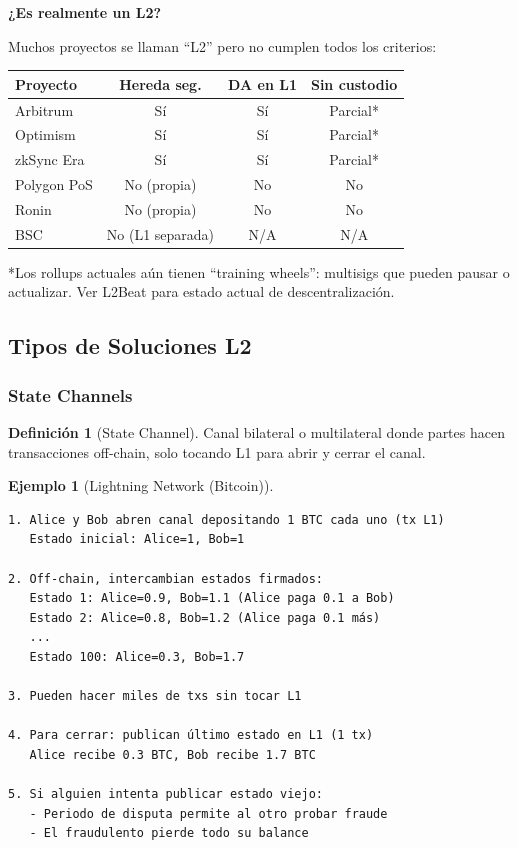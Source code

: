 \documentclass[11pt,a4paper,twoside,openright]{book}
\theoremstyle{definition}
\newtheorem{definition}{Definición}[chapter]
\newtheorem{example}{Ejemplo}[chapter]
\theoremstyle{plain}
\theoremstyle{remark}
\begin{document}
\begin{advertencia}
\textbf{¿Es realmente un L2?}

Muchos proyectos se llaman ``L2'' pero no cumplen todos los criterios:

\begin{center}
\begin{tabular}{lccc}
\toprule
\textbf{Proyecto} & \textbf{Hereda seg.} & \textbf{DA en L1} & \textbf{Sin custodio} \\
\midrule
Arbitrum & Sí & Sí & Parcial* \\
Optimism & Sí & Sí & Parcial* \\
zkSync Era & Sí & Sí & Parcial* \\
Polygon PoS & No (propia) & No & No \\
Ronin & No (propia) & No & No \\
BSC & No (L1 separada) & N/A & N/A \\
\bottomrule
\end{tabular}
\end{center}

*Los rollups actuales aún tienen ``training wheels'': multisigs que pueden pausar o actualizar. Ver L2Beat para estado actual de descentralización.
\end{advertencia}

\subsection{Tipos de Soluciones L2}

\subsubsection{State Channels}

\begin{definition}[State Channel]
Canal bilateral o multilateral donde partes hacen transacciones off-chain, solo tocando L1 para abrir y cerrar el canal.
\end{definition}

\begin{example}[Lightning Network (Bitcoin)]
\begin{verbatim}
1. Alice y Bob abren canal depositando 1 BTC cada uno (tx L1)
   Estado inicial: Alice=1, Bob=1

2. Off-chain, intercambian estados firmados:
   Estado 1: Alice=0.9, Bob=1.1 (Alice paga 0.1 a Bob)
   Estado 2: Alice=0.8, Bob=1.2 (Alice paga 0.1 más)
   ...
   Estado 100: Alice=0.3, Bob=1.7

3. Pueden hacer miles de txs sin tocar L1

4. Para cerrar: publican último estado en L1 (1 tx)
   Alice recibe 0.3 BTC, Bob recibe 1.7 BTC

5. Si alguien intenta publicar estado viejo:
   - Periodo de disputa permite al otro probar fraude
   - El fraudulento pierde todo su balance
\end{verbatim}
\end{example}
\end{document}
